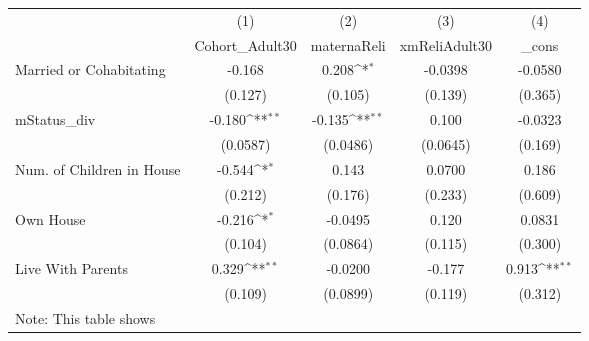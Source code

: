 {
\def\sym#1{\ifmmode^{#1}\else\(^{#1}\)\fi}
\begin{tabular}{l*{4}{c}}
\hline\hline
            &\multicolumn{1}{c}{(1)}&\multicolumn{1}{c}{(2)}&\multicolumn{1}{c}{(3)}&\multicolumn{1}{c}{(4)}\\
            &\multicolumn{1}{c}{Cohort\_Adult30}&\multicolumn{1}{c}{maternaReli}&\multicolumn{1}{c}{xmReliAdult30}&\multicolumn{1}{c}{\_cons}\\
\hline
Married or Cohabitating&      -0.168         &       0.208\sym{*}  &     -0.0398         &     -0.0580         \\
            &     (0.127)         &     (0.105)         &     (0.139)         &     (0.365)         \\
[1em]
mStatus\_div &      -0.180\sym{**} &      -0.135\sym{**} &       0.100         &     -0.0323         \\
            &    (0.0587)         &    (0.0486)         &    (0.0645)         &     (0.169)         \\
[1em]
Num. of Children in House&      -0.544\sym{*}  &       0.143         &      0.0700         &       0.186         \\
            &     (0.212)         &     (0.176)         &     (0.233)         &     (0.609)         \\
[1em]
Own House   &      -0.216\sym{*}  &     -0.0495         &       0.120         &      0.0831         \\
            &     (0.104)         &    (0.0864)         &     (0.115)         &     (0.300)         \\
[1em]
Live With Parents&       0.329\sym{**} &     -0.0200         &      -0.177         &       0.913\sym{**} \\
            &     (0.109)         &    (0.0899)         &     (0.119)         &     (0.312)         \\
\hline\hline
\multicolumn{5}{l}{\footnotesize Note: This table shows}\\
\end{tabular}
}
